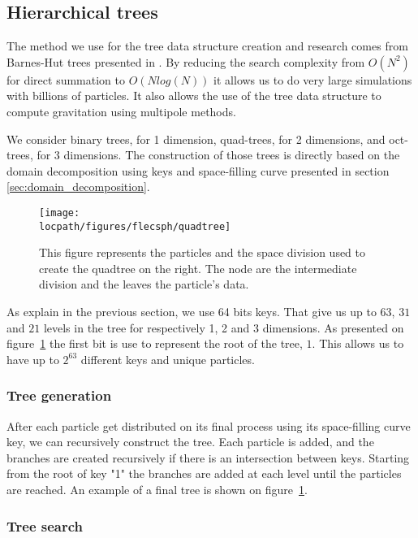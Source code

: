 \subsection{Hierarchical trees}
\label{sec:trees}

The method we use for the tree data structure creation and research comes from Barnes-Hut trees presented in \cite{barnes1986hierarchical,barnes1990modified}. 
By reducing the search complexity from $O(N^2)$ for direct summation to $O(Nlog(N))$ it allows us to do very large simulations with billions of particles. 
It also allows the use of the tree data structure to compute gravitation using multipole methods.

We consider binary trees, for 1 dimension, quad-trees, for 2 dimensions, and oct-trees, for 3 dimensions. 
The construction of those trees is directly based on the domain decomposition using keys and space-filling curve presented in section \ref{sec:domain_decomposition}. 

\begin{figure}[t!]
\centering
\texttt{[image: \\locpath/figures/flecsph/quadtree]}
\caption[Particles and quadtree representation. ]{This figure represents the particles and the space division used to create the quadtree on the right. The node are the intermediate division and the leaves the particle's data.}
\label{fig:quadtree}
\end{figure}

As explain in the previous section, we use 64 bits keys.
That give us up to $63$, $31$ and $21$ levels in the tree for respectively 1, 2 and 3 dimensions. 
As presented on figure~\ref{fig:quadtree} the first bit is use to represent the root of the tree, $1$.
This allows us to have up to $2^{63}$ different keys and unique particles.  

\subsubsection{Tree generation}

After each particle get distributed on its final process using its space-filling curve key, we can recursively construct the tree.
Each particle is added, and the branches are created recursively if there is an intersection between keys. 
Starting from the root of key "1" the branches are added at each level until the particles are reached.
An example of a final tree is shown on figure~\ref{fig:quadtree}.

\subsubsection{Tree search}

